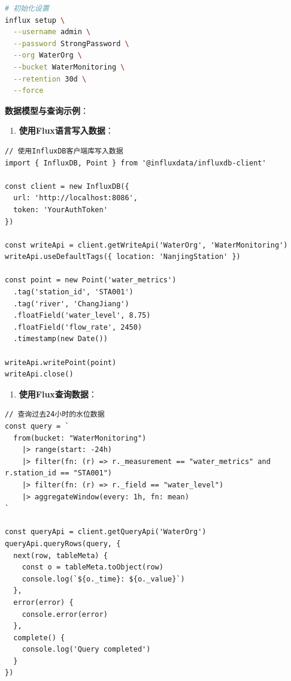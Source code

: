 \begin{lstlisting}[language=bash]
# 初始化设置
influx setup \
  --username admin \
  --password StrongPassword \
  --org WaterOrg \
  --bucket WaterMonitoring \
  --retention 30d \
  --force
\end{lstlisting}

\textbf{数据模型与查询示例}：

\begin{enumerate}
\def\labelenumi{\arabic{enumi}.}
\tightlist
\item
  \textbf{使用Flux语言写入数据}：
\end{enumerate}

\begin{lstlisting}
// 使用InfluxDB客户端库写入数据
import { InfluxDB, Point } from '@influxdata/influxdb-client'

const client = new InfluxDB({
  url: 'http://localhost:8086',
  token: 'YourAuthToken'
})

const writeApi = client.getWriteApi('WaterOrg', 'WaterMonitoring')
writeApi.useDefaultTags({ location: 'NanjingStation' })

const point = new Point('water_metrics')
  .tag('station_id', 'STA001')
  .tag('river', 'ChangJiang')
  .floatField('water_level', 8.75)
  .floatField('flow_rate', 2450)
  .timestamp(new Date())

writeApi.writePoint(point)
writeApi.close()
\end{lstlisting}

\begin{enumerate}
\def\labelenumi{\arabic{enumi}.}
\setcounter{enumi}{1}
\tightlist
\item
  \textbf{使用Flux查询数据}：
\end{enumerate}

\begin{lstlisting}
// 查询过去24小时的水位数据
const query = `
  from(bucket: "WaterMonitoring")
    |> range(start: -24h)
    |> filter(fn: (r) => r._measurement == "water_metrics" and r.station_id == "STA001")
    |> filter(fn: (r) => r._field == "water_level")
    |> aggregateWindow(every: 1h, fn: mean)
`

const queryApi = client.getQueryApi('WaterOrg')
queryApi.queryRows(query, {
  next(row, tableMeta) {
    const o = tableMeta.toObject(row)
    console.log(`${o._time}: ${o._value}`)
  },
  error(error) {
    console.error(error)
  },
  complete() {
    console.log('Query completed')
  }
})
\end{lstlisting}

